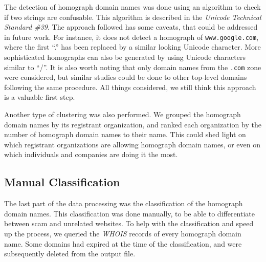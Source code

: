 \documentclass[letterpaper,twocolumn,10pt]{article}
\begin{document}
The detection of homograph domain names was done using an algorithm to check if two strings are confusable.
This algorithm is described in the \textit{Unicode Technical Standard \#39}.
The approach followed has some caveats, that could be addressed in future work.
For instance, it does not detect a homograph of \texttt{www.google.com}, where the first ``.'' has been replaced by a similar looking Unicode character.
More sophisticated homographs can also be generated by using Unicode characters similar to ``/''.
It is also worth noting that only domain names from the \texttt{.com} zone were considered, but similar studies could be done to other top-level domains following the same procedure.
All things considered, we still think this approach is a valuable first step.

Another type of clustering was also performed.
We grouped the homograph domain names by its registrant organization, and ranked each organization by the number of homograph domain names to their name.
This could shed light on which registrant organizations are allowing homograph domain names, or even on which individuals and companies are doing it the most.

\subsection{Manual Classification}
The last part of the data processing was the classification of the homograph domain names.
This classification was done manually, to be able to differentiate between scam and unrelated websites.
To help with the classification and speed up the process, we queried the \textit{WHOIS} records of every homograph domain name.
Some domains had expired at the time of the classification, and were subsequently deleted from the output file.
\end{document}
